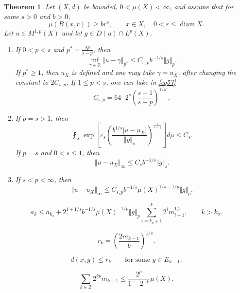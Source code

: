 \documentclass[10pt,a4paper]{amsart}
\newtheorem{theorem}{Theorem}
\def\diam{\operatorname{diam}}
\begin{document}
\begin{theorem}
\label{T1}
Let $(X,d)$ be bounded, $0<\mu(X)<\infty$, and assume that for some $s>0$ and $b>0$,
\begin{equation}
\label{eq1}
 \mu(B(x,r))\ge br^s,
 \qquad x\in X,\quad 0<r\leq\diam X.
\end{equation}
Let $u\in M^{1,p}(X)$ and let $g\in D(u)\cap L^p(X)$.
\begin{enumerate}
\item If $0<p<s$ and $p^*=\frac{sp}{s-p}$,
then
\begin{equation}
\label{eq57}
 \inf_{\gamma\in\mathbb R}\Vert u-\gamma\Vert_{p^*}
 \leq C_{s,p}b^{-1/s}\Vert g\Vert_p.
\end{equation}
If $p^*\ge1$, then $u_X$ is defined and one may take $\gamma=u_X$, after changing the constant to $2C_{s,p}$. If $1\leq p<s$, one can take in \eqref{eq57}
\begin{equation}
\label{eq16}
C_{s,p}=64\cdot 2^s\left(\frac{s-1}{s-p}\right)^{1/s'},
\end{equation}
\item If $p=s>1$, then
\begin{equation}
\label{eq17}
\fint_X
 \exp\!\left[
 c_s\left(
 \frac{b^{1/s}|u-u_X|}{\Vert g\Vert_{s}}
 \right)^{\frac{s}{s-1}}
 \right]d\mu
 \leq C_s.
\end{equation}
If $p=s$ and $0<s\leq1$, then
\[
 \Vert u-u_X\Vert_{\infty}
 \leq C_s b^{-1/s}\Vert g\Vert_{s}.
\]

\item If $s<p<\infty$, then
\[
 \Vert u-u_X\Vert_{\infty}
 \leq C_{s,p}b^{-1/s}\mu(X)^{1/s-1/p}\Vert g\Vert_p.
\]
\end{enumerate}
\end{theorem}

\begin{equation}
\label{eq9}
a_k\leq a_{k_o}
+2^{1+1/s}b^{-1/s}\mu(X)^{-1/p}\Vert g\Vert_p\sum_{i=k_o+1}^k 2^im_{i-1}^{1/s},
\qquad
k> k_o.
\end{equation}

\begin{equation}
\label{eq6}
 r_k=\left(\frac{2m_{k-1}}b\right)^{1/s}.
\end{equation}

\begin{equation}
\label{eq7}
d(x,y)\leq r_k
\qquad
\text{for some } y\in E_{k-1}.
\end{equation}

\begin{equation}
\label{eq8}
\sum_{k\in\mathbb Z}
2^{kp}m_{k-1}
\leq \frac{2^p}{1-2^{-p}} \mu(X).
\end{equation}
\end{document}
